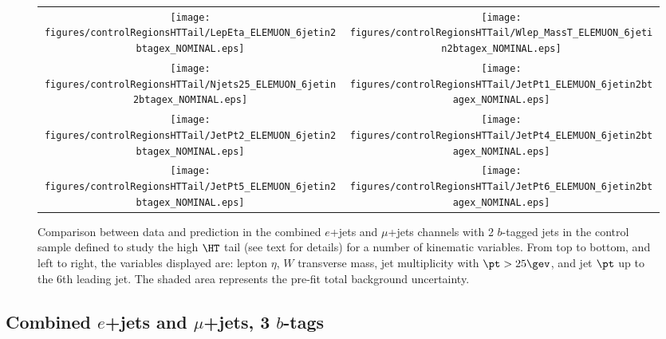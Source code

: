 \begin{figure}[htbp]
\begin{center}
\begin{tabular}{cc}
%
\texttt{[image: figures/controlRegionsHTTail/LepEta\_ELEMUON\_6jetin2btagex\_NOMINAL.eps]} &
\texttt{[image: figures/controlRegionsHTTail/Wlep\_MassT\_ELEMUON\_6jetin2btagex\_NOMINAL.eps]} \\
\texttt{[image: figures/controlRegionsHTTail/Njets25\_ELEMUON\_6jetin2btagex\_NOMINAL.eps]} &
\texttt{[image: figures/controlRegionsHTTail/JetPt1\_ELEMUON\_6jetin2btagex\_NOMINAL.eps]} \\
\texttt{[image: figures/controlRegionsHTTail/JetPt2\_ELEMUON\_6jetin2btagex\_NOMINAL.eps]} &
\texttt{[image: figures/controlRegionsHTTail/JetPt4\_ELEMUON\_6jetin2btagex\_NOMINAL.eps]} \\
\texttt{[image: figures/controlRegionsHTTail/JetPt5\_ELEMUON\_6jetin2btagex\_NOMINAL.eps]} &
\texttt{[image: figures/controlRegionsHTTail/JetPt6\_ELEMUON\_6jetin2btagex\_NOMINAL.eps]} \\
\end{tabular}\caption{\small {Comparison between data and prediction in the combined $e$+jets and $\mu$+jets channels with 2 $b$-tagged jets in the control sample
defined to study the high $\HT$ tail (see text for details)  for a number of kinematic
variables. From top to bottom, and left to right, the variables displayed are: lepton $\eta$, $W$ transverse mass, jet multiplicity with $\pt>25\gev$, 
and jet $\pt$ up to the 6th leading jet.
The shaded area represents the pre-fit total background uncertainty.}}
\label{fig:ELEMUON_controlHTTail_2btagex_2}
\end{center}
\end{figure}

\clearpage
\subsection{Combined $e$+jets and $\mu$+jets, 3 $b$-tags}
\label{sec:ELEMUON_controlHTTail_3tagex}

